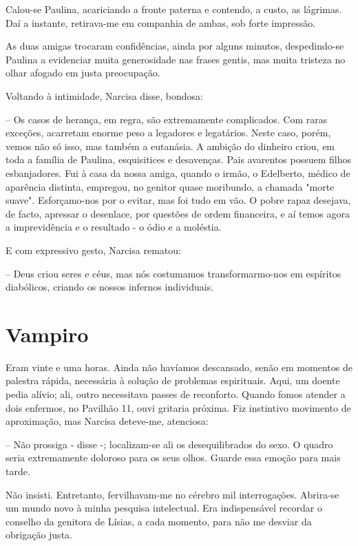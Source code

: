 \documentclass[portuguese,12pt,a4paper]{scrbook}
\begin{document}
	
	Calou-se Paulina, acariciando a fronte paterna e contendo, a custo, as lágrimas. Daí a instante, retirava-me em companhia de ambas, sob forte impressão.
	
	As duas amigas trocaram confidências, ainda por alguns minutos, despedindo-se Paulina a evidenciar muita generosidade nas frases gentis, mas muita tristeza no olhar afogado em justa preocupação.
	
	Voltando à intimidade, Narcisa disse, bondosa:
	
	– Os casos de herança, em regra, são extremamente complicados. Com raras exceções, acarretam enorme peso a legadores e legatários. Neste caso, porém, vemos não só isso, mas também a eutanásia. A ambição do dinheiro criou, em toda a família de Paulina, esquisitices e desavenças. Pais avarentos possuem filhos esbanjadores. Fui à casa da nossa amiga, quando o irmão, o Edelberto, médico de aparência distinta, empregou, no genitor quase moribundo, a chamada "morte suave". Esforçamo-nos por o evitar, mas foi tudo em vão. O pobre rapaz desejava, de facto, apressar o desenlace, por questões de ordem financeira, e aí temos agora a imprevidência e o resultado - o ódio e a moléstia.
	
	E com expressivo gesto, Narcisa rematou:
	
	– Deus criou seres e céus, mas nós costumamos transformarmo-nos em espíritos diabólicos, criando os nossos infernos individuais.
	
	
	\chapter{Vampiro}
	
	Eram vinte e uma horas. Ainda não havíamos descansado, senão em momentos de palestra rápida, necessária à solução de problemas espirituais. Aqui, um doente pedia alívio; ali, outro necessitava passes de reconforto. Quando fomos atender a dois enfermos, no Pavilhão 11, ouvi gritaria próxima. Fiz instintivo movimento de aproximação, mas Narcisa deteve-me, atenciosa:
	
	– Não prossiga - disse -; localizam-se ali os desequilibrados do sexo. O quadro seria extremamente doloroso para os seus olhos. Guarde essa emoção para mais tarde.
	
	Não insisti. Entretanto, fervilhavam-me no cérebro mil interrogações. Abrira-se um mundo novo à minha pesquisa intelectual. Era indispensável recordar o conselho da genitora de Lísias, a cada momento, para não me desviar da obrigação justa.
	
\end{document}
